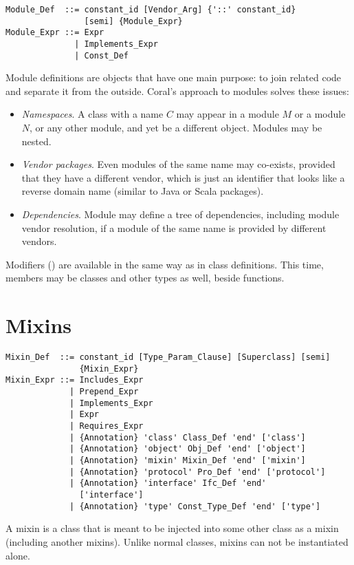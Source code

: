 \syntax\begin{lstlisting}
Module_Def  ::= constant_id [Vendor_Arg] {'::' constant_id} 
                [semi] {Module_Expr}
Module_Expr ::= Expr
              | Implements_Expr
              | Const_Def
\end{lstlisting}

Module definitions are objects that have one main purpose: to join related code and separate it from the outside. Coral's approach to modules solves these issues: 
\begin{itemize}
\item {\em Namespaces}. A class with a name $C$ may appear in a module $M$ or a module $N$, or any other module, and yet be a different object. Modules may be nested.
\item {\em Vendor packages}. Even modules of the same name may co-exists, provided that they have a different vendor, which is just an identifier that looks like a reverse domain name (similar to Java or Scala packages). 
\item {\em Dependencies}. Module may define a tree of dependencies, including module vendor resolution, if a module of the same name is provided by different vendors. 
\end{itemize}

Modifiers () are available in the same way as in class definitions. This time, members may be classes and other types as well, beside functions. 

\section{Mixins}
\label{sec:mixins}

\syntax\begin{lstlisting}
Mixin_Def  ::= constant_id [Type_Param_Clause] [Superclass] [semi] 
               {Mixin_Expr}
Mixin_Expr ::= Includes_Expr
             | Prepend_Expr
             | Implements_Expr
             | Expr
             | Requires_Expr
             | {Annotation} 'class' Class_Def 'end' ['class']
             | {Annotation} 'object' Obj_Def 'end' ['object']
             | {Annotation} 'mixin' Mixin_Def 'end' ['mixin']
             | {Annotation} 'protocol' Pro_Def 'end' ['protocol']
             | {Annotation} 'interface' Ifc_Def 'end' 
               ['interface']
             | {Annotation} 'type' Const_Type_Def 'end' ['type']
\end{lstlisting}

A mixin is a class that is meant to be injected into some other class as a mixin (including another mixins). Unlike normal classes, mixins can not be instantiated alone. 

